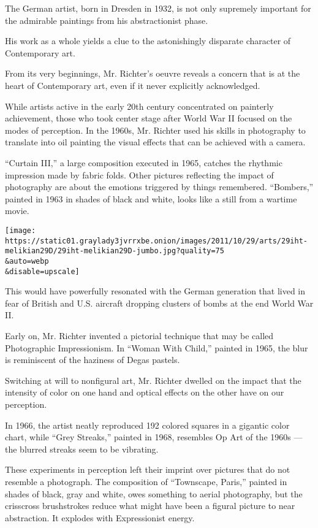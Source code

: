 The German artist, born in Dresden in 1932, is not only supremely
important for the admirable paintings from his abstractionist phase.

His work as a whole yields a clue to the astonishingly disparate
character of Contemporary art.

From its very beginnings, Mr. Richter's oeuvre reveals a concern that is
at the heart of Contemporary art, even if it never explicitly
acknowledged.

While artists active in the early 20th century concentrated on painterly
achievement, those who took center stage after World War II focused on
the modes of perception. In the 1960s, Mr. Richter used his skills in
photography to translate into oil painting the visual effects that can
be achieved with a camera.

``Curtain III,'' a large composition executed in 1965, catches the
rhythmic impression made by fabric folds. Other pictures reflecting the
impact of photography are about the emotions triggered by things
remembered. ``Bombers,'' painted in 1963 in shades of black and white,
looks like a still from a wartime movie.

\texttt{[image: https://static01.graylady3jvrrxbe.onion/images/2011/10/29/arts/29iht-melikian29D/29iht-melikian29D-jumbo.jpg?quality=75\\\&auto=webp\\\&disable=upscale]}

This would have powerfully resonated with the German generation that
lived in fear of British and U.S. aircraft dropping clusters of bombs at
the end World War II.

Early on, Mr. Richter invented a pictorial technique that may be called
Photographic Impressionism. In ``Woman With Child,'' painted in 1965,
the blur is reminiscent of the haziness of Degas pastels.

Switching at will to nonfigural art, Mr. Richter dwelled on the impact
that the intensity of color on one hand and optical effects on the other
have on our perception.

In 1966, the artist neatly reproduced 192 colored squares in a gigantic
color chart, while ``Grey Streaks,'' painted in 1968, resembles Op Art
of the 1960s --- the blurred streaks seem to be vibrating.

These experiments in perception left their imprint over pictures that do
not resemble a photograph. The composition of ``Townscape, Paris,''
painted in shades of black, gray and white, owes something to aerial
photography, but the crisscross brushstrokes reduce what might have been
a figural picture to near abstraction. It explodes with Expressionist
energy.

